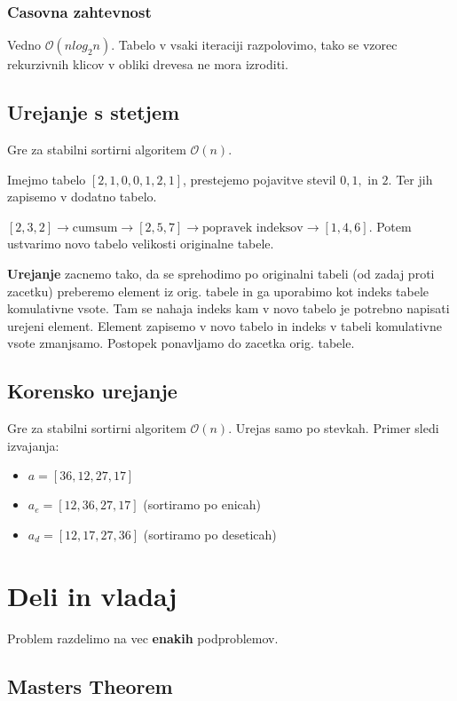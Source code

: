 \documentclass{article}
\begin{document}
\begin{multicols}{2}
	\subsubsection{Casovna zahtevnost}
	Vedno $\mathcal{O}(nlog_2n)$. Tabelo v vsaki iteraciji razpolovimo, tako se vzorec rekurzivnih klicov v obliki drevesa ne mora izroditi.

	\subsection{Urejanje s stetjem}
	Gre za stabilni sortirni algoritem $\mathcal{O}(n)$.

	Imejmo tabelo $[2, 1, 0, 0, 1,  2, 1]$, prestejemo pojavitve stevil $0, 1, \text{ in } 2$. Ter jih zapisemo v dodatno tabelo.

	$[2, 3, 2] \rightarrow \text{cumsum} \rightarrow [2, 5 , 7] \rightarrow  \text{popravek indeksov} \rightarrow [1, 4, 6]$.
	Potem ustvarimo novo tabelo velikosti originalne tabele.

	\textbf{Urejanje} zacnemo tako, da se sprehodimo po originalni tabeli (od zadaj proti zacetku) preberemo element iz orig. tabele in ga uporabimo kot indeks tabele komulativne vsote. Tam se nahaja indeks kam v novo tabelo je potrebno napisati urejeni element. Element zapisemo v novo tabelo in indeks v tabeli komulativne vsote zmanjsamo. Postopek ponavljamo do zacetka orig. tabele.

	\subsection{Korensko urejanje}
	Gre za stabilni sortirni algoritem $\mathcal{O}(n)$.
	Urejas samo po stevkah.
	Primer sledi izvajanja:
	\begin{itemize}
		\item $a = [36, 12, 27, 17]$
		\item $a_e = [12, 36, 27, 17]$ (sortiramo po enicah)
		\item $a_d = [12, 17, 27, 36]$ (sortiramo po deseticah)
	\end{itemize}

	\section{Deli in vladaj}
	Problem razdelimo na vec \textbf{enakih} podproblemov.

	\subsection{Masters Theorem}


\end{multicols}
\end{document}
